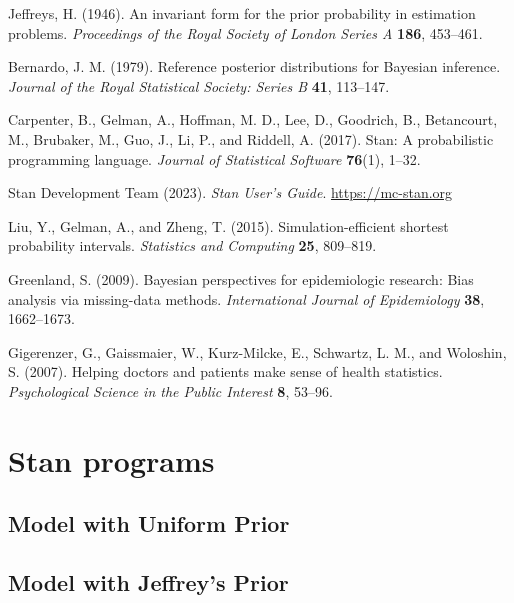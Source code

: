 \documentclass[11pt]{article}
\begin{document}
\bibitem Jeffreys, H. (1946).
An invariant form for the prior probability in estimation problems.
{\em Proceedings of the Royal Society of London Series A} {\bf 186}, 453--461.

\bibitem Bernardo, J. M. (1979).
Reference posterior distributions for Bayesian inference.
{\em Journal of the Royal Statistical Society: Series B} {\bf 41}, 113--147.

\bibitem Carpenter, B., Gelman, A., Hoffman, M. D., Lee, D., Goodrich, B.,
Betancourt, M., Brubaker, M., Guo, J., Li, P., and Riddell, A. (2017).
Stan: A probabilistic programming language.
{\em Journal of Statistical Software} {\bf 76}(1), 1--32.

\bibitem Stan Development Team (2023).
{\em Stan User's Guide}.
{\small \url{https://mc-stan.org}}

\bibitem Liu, Y., Gelman, A., and Zheng, T. (2015).
Simulation-efficient shortest probability intervals.
{\em Statistics and Computing} {\bf 25}, 809--819.

\bibitem Greenland, S. (2009).
Bayesian perspectives for epidemiologic research: Bias analysis via missing-data methods.
{\em International Journal of Epidemiology} {\bf 38}, 1662--1673.

\bibitem Gigerenzer, G., Gaissmaier, W., Kurz-Milcke, E., Schwartz, L. M.,
and Woloshin, S. (2007).
Helping doctors and patients make sense of health statistics.
{\em Psychological Science in the Public Interest} {\bf 8}, 53--96.


\pagebreak
\appendix

\section{Stan programs}

\subsection{Model with Uniform Prior}

\vspace{-\baselineskip}
\begin{small}
	\begin{quotation}\noindent
		
	\end{quotation}
\end{small}


\subsection{Model with Jeffrey's Prior}
\end{document}
